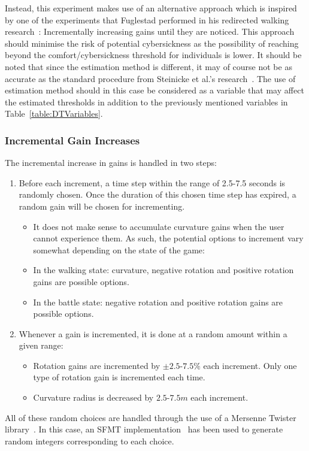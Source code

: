 Instead, this experiment makes use of an alternative approach which is inspired by one of the experiments that Fuglestad performed in his redirected walking research~\cite{fuglestad2018redirected}: Incrementally increasing gains until they are noticed. This approach should minimise the risk of potential cybersickness as the possibility of reaching beyond the comfort/cybersickness threshold for individuals is lower. It should be noted that since the estimation method is different, it may of course not be as accurate as the standard procedure from Steinicke et al.'s research~\cite{5072212}. The use of estimation method should in this case be considered as a variable that may affect the estimated thresholds in addition to the previously mentioned variables in Table~\ref{table:DTVariables}.

\subsubsection{Incremental Gain Increases}
The incremental increase in gains is handled in two steps:

\begin{enumerate}
    \item Before each increment, a time step within the range of 2.5-7.5 seconds is randomly chosen. Once the duration of this chosen time step has expired, a random gain will be chosen for incrementing.
    \begin{itemize}
        \item It does not make sense to accumulate curvature gains when the user cannot experience them. As such, the potential options to increment vary somewhat depending on the state of the game:
        \item In the walking state: curvature, negative rotation and positive rotation gains are possible options.
        \item In the battle state: negative rotation and positive rotation gains are possible options.
    \end{itemize}
    \item Whenever a gain is incremented, it is done at a random amount within a given range:
    \begin{itemize}
        \item Rotation gains are incremented by $\pm2.5$-$7.5\%$ each increment. Only one type of rotation gain is incremented each time.
        \item Curvature radius is decreased by $2.5$-$7.5m$ each increment.
    \end{itemize}
\end{enumerate}
All of these random choices are handled through the use of a Mersenne Twister library~\cite{MersenneTwisterLibraryLink}. In this case, an SFMT implementation~\cite{saito2008simd} has been used to generate random integers corresponding to each choice. 

